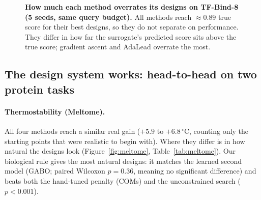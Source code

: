 \documentclass{article}
\begin{document}
\begin{figure}[t]
\centering
{}
\caption{\textbf{How much each method overrates its designs on TF-Bind-8 (5 seeds, same
query budget).} All methods reach $\approx0.89$ true score for their best designs, so they do
not separate on performance. They differ in how far the surrogate's predicted score sits
above the true score; gradient ascent and AdaLead overrate the most.}
\label{fig:tfbind}
\end{figure}

\subsection{The design system works: head-to-head on two protein tasks}

\paragraph{Thermostability (Meltome).}
All four methods reach a similar real gain ($+5.9$ to $+6.8\,^{\circ}$C, counting only the
starting points that were realistic to begin with). Where they differ is in how natural the
designs look (Figure~\ref{fig:meltome}, Table~\ref{tab:meltome}). Our biological rule gives
the most natural designs: it matches the learned second model (GABO; paired Wilcoxon
$p=0.36$, meaning no significant difference) and beats both the hand-tuned penalty (COMs) and
the unconstrained search ($p<0.001$).
\end{document}
